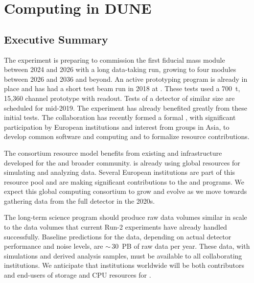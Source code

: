 

\chapter{Computing in DUNE}
\label{ch:exec-comp}

\section{Executive Summary}
\label{ch:exec-comp-es}

The  experiment is preparing to commission the first \nominalmodsize fiducial mass  module between 2024 and 2026 with a long data-taking run, growing to four modules between 2026 and 2036 and beyond.  An active prototyping program is already in place and has had  a short test beam run in 2018 at .  These tests used  a \SI{700}{t}, 15,360 channel prototype  with  readout.  Tests of a  detector of similar size are scheduled for mid-2019.   The  experiment has already  benefited greatly from these initial tests.  The collaboration has recently formed a formal , with significant participation by European institutions and interest from groups in Asia, to develop common software and computing and to formalize resource contributions.

The consortium resource model benefits from existing   and  infrastructure developed for the  and broader  community.   %
is already using global resources for simulating and analyzing   data.  Several European institutions are part of this resource pool and are making significant contributions to the  and  programs.  We expect this global computing consortium to grow and evolve as we move towards gathering data from the full  detector in the 2020s.

The long-term  science program should produce raw data volumes similar in scale to the data volumes that current  Run-2 experiments have already handled successfully.  Baseline predictions for the  data, depending on actual detector performance and noise levels, are $\sim\,$\SI{30}{PB} of raw data per year.  These data, with simulations and derived analysis samples, must be available to all collaborating institutions.  We anticipate that institutions worldwide will be both contributors and end-users of storage and CPU resources for .




